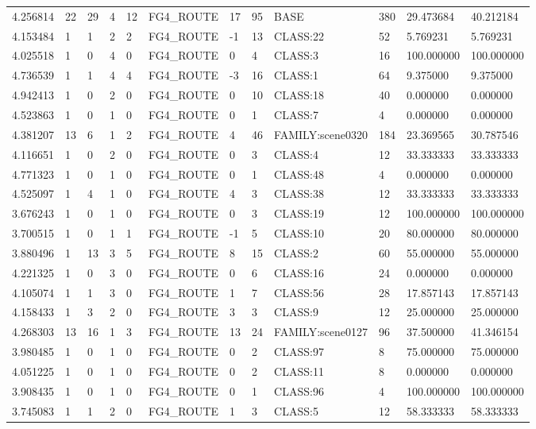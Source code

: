 \begin{tabular}{llllllllllll}
4.256814 & 22 & 29 & 4 & 12 & FG4\_ROUTE & 17 & 95 & BASE & 380 & 29.473684 & 40.212184 \\
4.153484 & 1 & 1 & 2 & 2 & FG4\_ROUTE & -1 & 13 & CLASS:22 & 52 & 5.769231 & 5.769231 \\
4.025518 & 1 & 0 & 4 & 0 & FG4\_ROUTE & 0 & 4 & CLASS:3 & 16 & 100.000000 & 100.000000 \\
4.736539 & 1 & 1 & 4 & 4 & FG4\_ROUTE & -3 & 16 & CLASS:1 & 64 & 9.375000 & 9.375000 \\
4.942413 & 1 & 0 & 2 & 0 & FG4\_ROUTE & 0 & 10 & CLASS:18 & 40 & 0.000000 & 0.000000 \\
4.523863 & 1 & 0 & 1 & 0 & FG4\_ROUTE & 0 & 1 & CLASS:7 & 4 & 0.000000 & 0.000000 \\
4.381207 & 13 & 6 & 1 & 2 & FG4\_ROUTE & 4 & 46 & FAMILY:scene0320 & 184 & 23.369565 & 30.787546 \\
4.116651 & 1 & 0 & 2 & 0 & FG4\_ROUTE & 0 & 3 & CLASS:4 & 12 & 33.333333 & 33.333333 \\
4.771323 & 1 & 0 & 1 & 0 & FG4\_ROUTE & 0 & 1 & CLASS:48 & 4 & 0.000000 & 0.000000 \\
4.525097 & 1 & 4 & 1 & 0 & FG4\_ROUTE & 4 & 3 & CLASS:38 & 12 & 33.333333 & 33.333333 \\
3.676243 & 1 & 0 & 1 & 0 & FG4\_ROUTE & 0 & 3 & CLASS:19 & 12 & 100.000000 & 100.000000 \\
3.700515 & 1 & 0 & 1 & 1 & FG4\_ROUTE & -1 & 5 & CLASS:10 & 20 & 80.000000 & 80.000000 \\
3.880496 & 1 & 13 & 3 & 5 & FG4\_ROUTE & 8 & 15 & CLASS:2 & 60 & 55.000000 & 55.000000 \\
4.221325 & 1 & 0 & 3 & 0 & FG4\_ROUTE & 0 & 6 & CLASS:16 & 24 & 0.000000 & 0.000000 \\
4.105074 & 1 & 1 & 3 & 0 & FG4\_ROUTE & 1 & 7 & CLASS:56 & 28 & 17.857143 & 17.857143 \\
4.158433 & 1 & 3 & 2 & 0 & FG4\_ROUTE & 3 & 3 & CLASS:9 & 12 & 25.000000 & 25.000000 \\
4.268303 & 13 & 16 & 1 & 3 & FG4\_ROUTE & 13 & 24 & FAMILY:scene0127 & 96 & 37.500000 & 41.346154 \\
3.980485 & 1 & 0 & 1 & 0 & FG4\_ROUTE & 0 & 2 & CLASS:97 & 8 & 75.000000 & 75.000000 \\
4.051225 & 1 & 0 & 1 & 0 & FG4\_ROUTE & 0 & 2 & CLASS:11 & 8 & 0.000000 & 0.000000 \\
3.908435 & 1 & 0 & 1 & 0 & FG4\_ROUTE & 0 & 1 & CLASS:96 & 4 & 100.000000 & 100.000000 \\
3.745083 & 1 & 1 & 2 & 0 & FG4\_ROUTE & 1 & 3 & CLASS:5 & 12 & 58.333333 & 58.333333 \\

\end{tabular}

